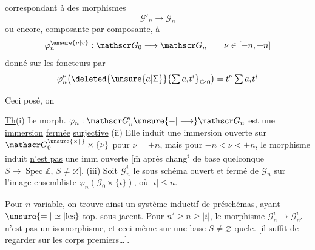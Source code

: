 correspondant à des morphismes
\[
\mathscr G'_n\longrightarrow\mathscr G_n
\]
 ou encore, composante par composante, à
\[
\varphi_n^{\unsure{\nu|v}}:\mathscr G_0\longrightarrow\mathscr G_n
\qquad \nu\in[-n,+n]
\]
donné  sur les foncteurs par
\[
\varphi_n^\nu\bigl(\deleted{\unsure{a|\Sigma}}{\textstyle\sum a_i t^i}_{i\geq0}\bigr)
=t^\nu\textstyle\sum a_i t^i
\]

Ceci posé, on 

\uline{Th}\quad (i) Le morph. $\varphi_n:\mathscr G'_n\unsure{\mathord{-}|\longrightarrow}\mathscr G_n$ est une \uline{immersion} \uline{fermée} \uline{surjective}
(ii) Elle induit une immersion ouverte sur $\mathscr G_0^{\unsure{\times|\,}} \times\{\nu\}$ pour $\nu=\pm n$, mais pour $-n<\nu<+n$, le morphisme induit \uline{n'est pas} une imm ouverte [$\bar{\mathrm m}$ après chang\textsuperscript{t} de base quelconque $S\longrightarrow\operatorname{Spec}\mathbb Z$, $S\ne\varnothing$].
(iii) Soit $\mathscr G_n^i$ le sous schéma ouvert  et fermé de $\mathscr G_n$  sur l'image ensembliste $\varphi_n(\mathscr G_0\times\{i\})$, où $|i|\leq n$.

Pour $n$ variable, on trouve ainsi un système inductif  de préschémas, ayant $\unsure{=|\simeq|\text{les}}$  top. sous-jacent. Pour  $n'\geq n\geq|i|$, le morphisme $\mathscr G_n^i\longrightarrow\mathscr G_{n'}^i$ n'est pas un isomorphisme, et ceci même sur une base $S\ne\varnothing$ quelc. [il suffit de regarder sur les corps premiers\ldots].
